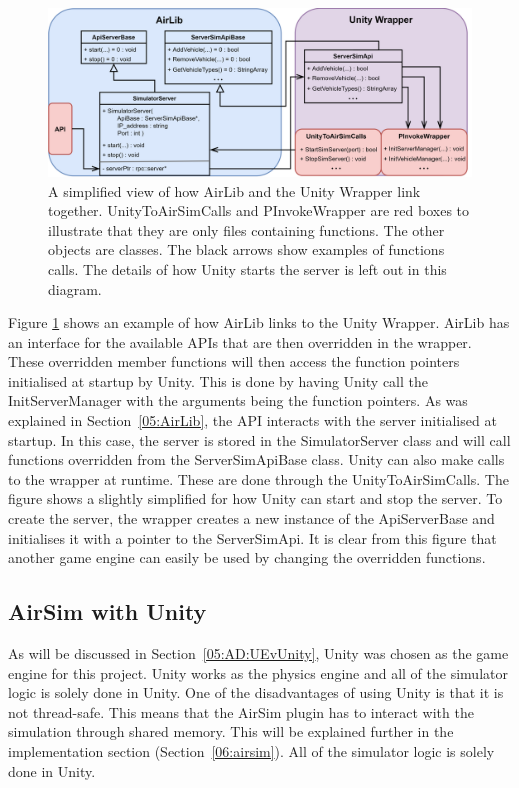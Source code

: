 \begin{figure}[h]
    \centering
    \includegraphics[width=1\textwidth]{05_AnalysisAndDesign/Diagrams/UnityWrapper2.png}
    \caption{A simplified view of how AirLib and the Unity Wrapper link together. UnityToAirSimCalls and PInvokeWrapper are red boxes to illustrate that they are only files containing functions. The other objects are classes. The black arrows show examples of functions calls. The details of how Unity starts the server is left out in this diagram.} \label{05:fig:UnityWrapper}
\end{figure}

Figure \ref{05:fig:UnityWrapper} shows an example of how AirLib links to the Unity Wrapper. AirLib has an interface for the available APIs that are then overridden in the wrapper. These overridden member functions will then access the function pointers initialised at startup by Unity. This is done by having Unity call the InitServerManager with the arguments being the function pointers. As was explained in Section~\ref{05:AirLib}, the API interacts with the server initialised at startup. In this case, the server is stored in the SimulatorServer class and will call functions overridden from the ServerSimApiBase class. Unity can also make calls to the wrapper at runtime. These are done through the UnityToAirSimCalls. The figure shows a slightly simplified for how Unity can start and stop the server. To create the server, the wrapper creates a new instance of the ApiServerBase and initialises it with a pointer to the ServerSimApi. It is clear from this figure that another game engine can easily be used by changing the overridden functions. 


\subsection{AirSim with Unity}
As will be discussed in Section~\ref{05:AD:UEvUnity}, Unity was chosen as the game engine for this project. Unity works as the physics engine and all of the simulator logic is solely done in Unity. One of the disadvantages of using Unity is that it is not thread-safe. This means that the AirSim plugin has to interact with the simulation through shared memory. This will be explained further in the implementation section (Section~\ref{06:airsim}). All of the simulator logic is solely done in Unity.

